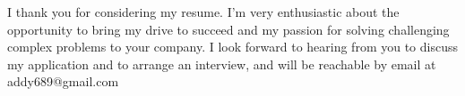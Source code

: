 I thank you for considering my resume. I'm very enthusiastic about the opportunity to bring my drive to succeed and my passion for solving challenging complex problems to your company. I look forward to hearing from you to discuss my application and to arrange an interview, and will be reachable by email at addy689@gmail.com

\makeletterclosing


